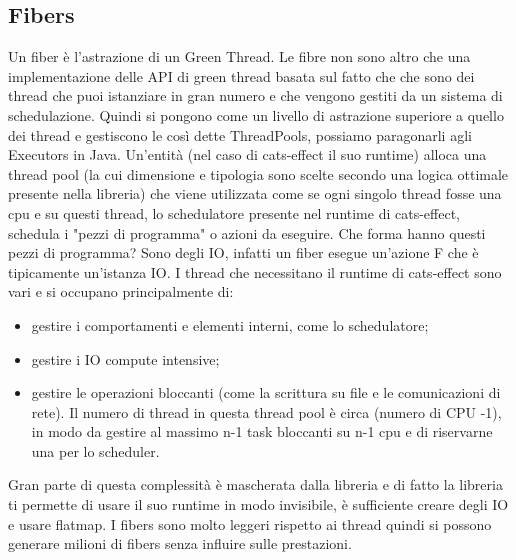 \subsection{Fibers}
Un fiber è l'astrazione di un Green Thread. Le fibre non sono altro che una implementazione delle API di green thread basata sul fatto che che sono dei thread che puoi istanziare in gran numero e che vengono gestiti da un sistema di schedulazione. Quindi si pongono come un livello di astrazione superiore a quello dei thread e gestiscono le così dette ThreadPools, possiamo paragonarli agli Executors in Java. Un'entità (nel caso di cats-effect il suo runtime) alloca una thread pool (la cui dimensione e tipologia sono scelte secondo una logica ottimale presente nella libreria) che viene utilizzata come se ogni singolo thread fosse una cpu e su questi thread, lo schedulatore presente nel runtime di cats-effect, schedula i "pezzi di programma" o azioni da eseguire. Che forma hanno questi pezzi di programma? Sono degli IO, infatti un fiber esegue un’azione F che è tipicamente un’istanza IO.
I thread che necessitano il runtime di cats-effect sono vari e si occupano principalmente di:
\begin{itemize}
    \item gestire i comportamenti e elementi interni, come lo schedulatore;
    \item gestire i IO compute intensive;
    \item gestire le operazioni bloccanti (come la scrittura su file e le comunicazioni di rete). Il numero di thread in questa thread pool è circa (numero di CPU -1), in modo da gestire al massimo n-1 task bloccanti su n-1 cpu e di riservarne una per lo scheduler.
\end{itemize}
Gran parte di questa complessità è mascherata dalla libreria e di fatto la libreria ti permette di usare il suo runtime in modo invisibile, è sufficiente creare degli IO e usare flatmap. I fibers sono molto leggeri rispetto ai thread quindi si possono generare milioni di fibers senza influire sulle prestazioni.

